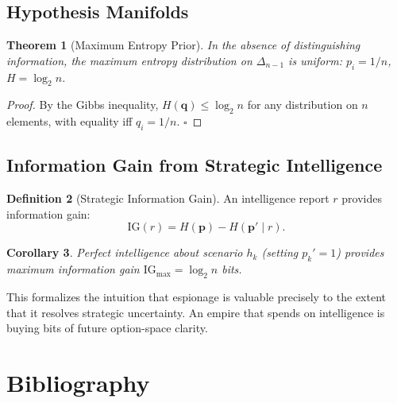 \documentclass[11pt,a4paper,openany]{book}
\theoremstyle{plain}
\newtheorem{theorem}{Theorem}[chapter]
\newtheorem{corollary}[theorem]{Corollary}
\theoremstyle{definition}
\newtheorem{definition}[theorem]{Definition}
\theoremstyle{remark}
\begin{document}
\section{Hypothesis Manifolds}

\begin{theorem}[Maximum Entropy Prior]
  In the absence of distinguishing information, the maximum entropy
  distribution on $\Delta_{n-1}$ is uniform: $p_i = 1/n$, $H = \log_2 n$.
\end{theorem}
\begin{proof}
  By the Gibbs inequality, $H(\mathbf{q}) \leq \log_2 n$ for any
  distribution on $n$ elements, with equality iff $q_i = 1/n$.
  $\square$
\end{proof}

\section{Information Gain from Strategic Intelligence}

\begin{definition}[Strategic Information Gain]
  An intelligence report $r$ provides information gain:
  \[
    \mathrm{IG}(r) = H(\mathbf{p}) - H(\mathbf{p}' \mid r).
  \]
\end{definition}

\begin{corollary}
  Perfect intelligence about scenario $h_k$ (setting $p_k' = 1$)
  provides maximum information gain $\mathrm{IG}_{\max} = \log_2 n$ bits.
\end{corollary}

This formalizes the intuition that espionage is valuable precisely to
the extent that it resolves strategic uncertainty. An empire that spends
on intelligence is buying bits of future option-space clarity.


\backmatter

\chapter*{Bibliography}
\end{document}
